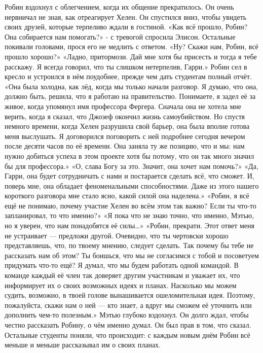 \documentclass[a4paper,12pt]{book}
\begin{document}
	Робин вздохнул с облегчением, когда их общение прекратилось. Он очень нервничал не зная, как отреагирует Хелен.
	Он спустился вниз, чтобы увидеть своих друзей, которые терпеливо ждали в гостиной.
	«Как всё прошло, Робин? Она собирается нам помогать?» - с тревогой спросила Элисон. Остальные покивали головами, прося его не медлить с ответом.
	«Ну? Скажи нам, Робин, всё прошло хорошо?»
	«Ладно, притормози. Дай мне хотя бы присесть и тогда я тебе расскажу. Я всегда говорил, что ты слишком нетерпелив, Гарри.»
	Робин сел в кресло и устроился в нём поудобнее, прежде чем дать студентам полный отчёт.
	«Она была холодна, как лёд, когда мы только начали разговор. Я думаю, что она, должно быть, решила, что я работаю на правительство. Понимаете, я задел её за живое, когда упомянул имя профессора Фергера. Сначала она не хотела мне верить, когда я сказал, что Джозеф окончил жизнь самоубийством. Но спустя немного времени, когда Хелен разрушила свой барьер, она была вполне готова меня выслушать. Я договорился поговорить с ней подробнее сегодня вечером после десяти часов по её времени. Она заняла ту же позицию, что и мы: нам нужно добиться успеха в этом проекте хотя бы потому, что он так много значил бы для профессора.»
	«О, слава Богу за это. Значит, она хочет нам помочь?»
	«Да, Гарри, она будет сотрудничать с нами и постарается сделать всё, что сможет. И, поверь мне, она обладает феноменальными способностями. Даже из этого нашего короткого разговора мне стало ясно, какой силой она наделена.»
	«Робин, я всё ещё не понимаю, почему участие Хелен во всём этом так важно? Если ты что-то запланировал, то что именно?»
	«Я пока что не знаю точно, что именно, Мэтью, но я уверен, что нам понадобятся её силы…»
	«Робин, прекрати. Этот ответ меня не устраивает — предложи другой. Очевидно, что ты чертовски хорошо представляешь, что, по твоему мнению, следует сделать. Так почему бы тебе не рассказать нам об этом? Ты боишься, что мы не согласимся с тобой и посоветуем придумать что-то ещё? Я думал, что мы будем работать одной командой. В команде каждый её член так доверяет другим участникам и уважает их, что информирует их о своих возможных идеях и планах. Насколько мы можем судить, возможно, в твоей голове вынашивается ошеломительная идея. Поэтому, пожалуйста, скажи нам о ней — кто знает, а вдруг мы сможем её уточнить или дополнить чем-то полезным.»
	Мэтью глубоко вздохнул. Он долго ждал, чтобы честно рассказать Робину, о чём именно думал. Он был прав в том, что сказал. Остальные студенты поняли, что происходит: с каждым новым днём Робин всё меньше и меньше рассказывал им о своих планах.
\end{document}
